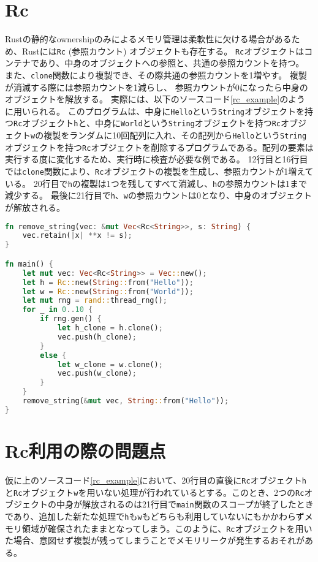 \documentclass{sumiilab-paper}
\theoremstyle{mystyle}
\numberwithin{definition}{chapter} %
\begin{document}
\section{Rc}
Rustの静的なownershipのみによるメモリ管理は柔軟性に欠ける場合があるため、Rustには\texttt{Rc} (参照カウント) オブジェクトも存在する。
\texttt{Rc}オブジェクトはコンテナであり、中身のオブジェクトへの参照と、共通の参照カウントを持つ。
また、\texttt{clone}関数により複製でき、その際共通の参照カウントを1増やす。
複製が消滅する際には参照カウントを1減らし、
参照カウントが0になったら中身のオブジェクトを解放する。
実際には、以下のソースコード\ref{rc_example}のように用いられる。
このプログラムは、中身に\texttt{Hello}という\texttt{String}オブジェクトを持つ\texttt{Rc}オブジェクト\texttt{h}と、中身に\texttt{World}という\texttt{String}オブジェクトを持つ\texttt{Rc}オブジェクト\texttt{w}の複製をランダムに10回配列に入れ、その配列から\texttt{Hello}という\texttt{String}オブジェクトを持つ\texttt{Rc}オブジェクトを削除するプログラムである。配列の要素は実行する度に変化するため、実行時に検査が必要な例である。
12行目と16行目では\texttt{clone}関数により、\texttt{Rc}オブジェクトの複製を生成し、参照カウントが1増えている。
20行目で\texttt{h}の複製は1つを残してすべて消滅し、\texttt{h}の参照カウントは1まで減少する。
最後に21行目で\texttt{h}、\texttt{w}の参照カウントは0となり、中身のオブジェクトが解放される。
\begin{lstlisting}[language=Rust, caption=Rcオブジェクトの利用例, label=rc_example, captionpos=b]
fn remove_string(vec: &mut Vec<Rc<String>>, s: String) {
    vec.retain(|x| **x != s);
}

fn main() {
    let mut vec: Vec<Rc<String>> = Vec::new();
    let h = Rc::new(String::from("Hello"));
    let w = Rc::new(String::from("World"));
    let mut rng = rand::thread_rng();
    for _ in 0..10 {
        if rng.gen() {
            let h_clone = h.clone();
            vec.push(h_clone);
        }
        else {
            let w_clone = w.clone();
            vec.push(w_clone);
        }
    }
    remove_string(&mut vec, String::from("Hello"));
}
\end{lstlisting}

\section{Rc利用の際の問題点}
仮に上のソースコード\ref{rc_example}において、20行目の直後に\texttt{Rc}オブジェクト\texttt{h}と\texttt{Rc}オブジェクト\texttt{w}を用いない処理が行われているとする。このとき、2つの\texttt{Rc}オブジェクトの中身が解放されるのは21行目で\texttt{main}関数のスコープが終了したときであり、追加した新たな処理で\texttt{h}も\texttt{w}もどちらも利用していないにもかかわらずメモリ領域が確保されたままとなってしまう。このように、\texttt{Rc}オブジェクトを用いた場合、意図せず複製が残ってしまうことでメモリリークが発生するおそれがある。
\end{document}
